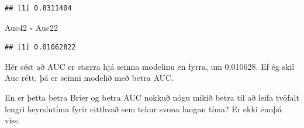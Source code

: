 \documentclass[
]{article}
\newenvironment{Shaded}{\begin{snugshade}}{\end{snugshade}}
\newcommand{\NormalTok}[1]{#1}
\newcommand{\OperatorTok}[1]{\textcolor[rgb]{0.81,0.36,0.00}{\textbf{#1}}}
\newcommand{\StringTok}[1]{\textcolor[rgb]{0.31,0.60,0.02}{#1}}
\begin{document}
\begin{verbatim}
## [1] 0.8311404
\end{verbatim}

\begin{Shaded}
\begin{Highlighting}[]
\NormalTok{Auc42 }\OperatorTok{-}\StringTok{ }\NormalTok{Auc22}
\end{Highlighting}
\end{Shaded}

\begin{verbatim}
## [1] 0.01062822
\end{verbatim}

Hér sést að AUC er stærra hjá seinna modelinu en fyrra, um 0.010628. Ef ég skil Auc rétt, þá er seinni modelið með betra AUC.

En er þetta betra Brier og betra AUC nokkuð nógu mikið betra til að leifa tvöfalt lengri keyrslutíma fyrir eitthvað sem tekur svona langan tíma? Er ekki ennþá viss.
\end{document}
